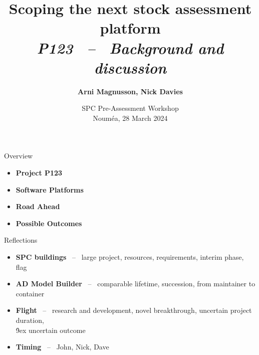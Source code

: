 \documentclass[aspectratio=169]{beamer}
\begin{document}
\begin{frame}
  \title{\vspace{-5ex}\darkblue Scoping the next stock assessment
    platform\\[2ex]
    \it\large\darkgray P123 ~--~ Background and discussion}
  \author{\vspace{-10ex}\darkgray\bf
    Arni Magnusson, Nick Davies}
  \date{\darkgreen SPC Pre-Assessment Workshop\\[0.5ex]
    Nouméa, 28 March 2024}
  \titlepage
\end{frame}


\begin{frame}{Overview}
  \begin{itemize}
    \item[] {\bf\darkblue Project P123} \\[5ex]
    \item[] {\bf\darkblue Software Platforms} \\[5ex]
    \item[] {\bf\darkblue Road Ahead} \\[5ex]
    \item[] {\bf\darkblue Possible Outcomes} \\[1ex]
  \end{itemize}
\end{frame}


\begin{frame}{Reflections}\small
  \begin{itemize}
    \item[] {\bf SPC buildings} ~--~ large project, resources, requirements,
    interim phase, flag\\[5ex]
    \item[] {\bf AD Model Builder} ~--~ comparable lifetime, succession,
    from maintainer to container\\[5ex]
    \item[] {\bf Flight} ~--~ research and development, novel breakthrough,
    uncertain project duration,\\[0.5ex]
    \h{9ex} uncertain outcome\\[5ex]
    \item[] {\bf Timing} ~--~ John, Nick, Dave\\[3ex]
  \end{itemize}
\end{frame}
\end{document}
